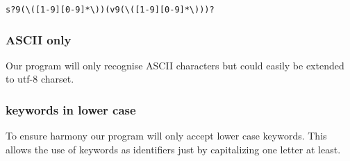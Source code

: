 \begin{verbatim}
s?9(\([1-9][0-9]*\))(v9(\([1-9][0-9]*\)))?
\end{verbatim}

\subsubsection{ASCII only}

Our program will only recognise ASCII characters but could easily be extended to utf-8 charset.

\subsubsection{keywords in lower case}

To ensure harmony our program will only accept lower case keywords. This allows the use of keywords as identifiers just by capitalizing one letter at least.






